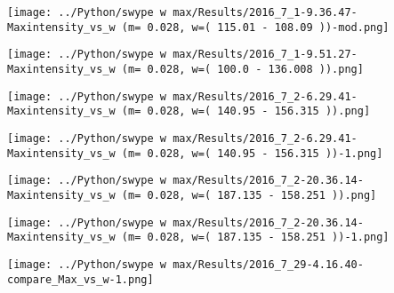 				\begin{minipage}{0.5\textwidth}
					\centering
					\texttt{[image: ../Python/swype w max/Results/2016\_7\_1-9.36.47-Maxintensity\_vs\_w (m= 0.028, w=( 115.01 - 108.09 ))-mod.png]}

					\label{mapa w 028 ambos campos}
				\end{minipage}		
				\begin{minipage}{0.5\textwidth}
					\centering
					\texttt{[image: ../Python/swype w max/Results/2016\_7\_1-9.51.27-Maxintensity\_vs\_w (m= 0.028, w=( 100.0 - 136.008 )).png]}
				\end{minipage}	
					
				\begin{minipage}{0.5\textwidth}
					\centering
					\texttt{[image: ../Python/swype w max/Results/2016\_7\_2-6.29.41-Maxintensity\_vs\_w (m= 0.028, w=( 140.95 - 156.315 )).png]}
				\end{minipage}		
				\begin{minipage}{0.5\textwidth}
					\centering
					\texttt{[image: ../Python/swype w max/Results/2016\_7\_2-6.29.41-Maxintensity\_vs\_w (m= 0.028, w=( 140.95 - 156.315 ))-1.png]}
				\end{minipage}	
				
				\begin{minipage}{0.5\textwidth}
					\centering
					\texttt{[image: ../Python/swype w max/Results/2016\_7\_2-20.36.14-Maxintensity\_vs\_w (m= 0.028, w=( 187.135 - 158.251 )).png]}
				\end{minipage}		
				\begin{minipage}{0.5\textwidth}
					\centering
					\texttt{[image: ../Python/swype w max/Results/2016\_7\_2-20.36.14-Maxintensity\_vs\_w (m= 0.028, w=( 187.135 - 158.251 ))-1.png]}
				\end{minipage}
	
			\begin{center}
				\texttt{[image: ../Python/swype w max/Results/2016\_7\_29-4.16.40-compare\_Max\_vs\_w-1.png]}
			\end{center}
				
